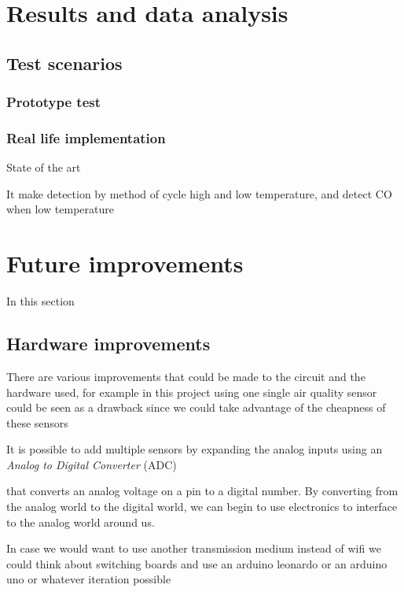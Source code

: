 \documentclass[conference]{IEEEtran}
\begin{document}
\section{Results and data analysis}\label{AA}
	\subsection{Test scenarios}

		\subsubsection{Prototype test}

		\subsubsection{Real life implementation}
			State of the art
	
	It make detection by method of cycle high and low temperature, and detect CO when low temperature \cite{mq7}


\section{Future improvements}\label{improvements}

	In this section 
	
	\subsection{Hardware improvements}
	
		There are various improvements that could be made to the circuit and the hardware used, for example in this project using one single air quality sensor could be seen as a drawback since we could take advantage of the cheapness of these sensors
		
		It is possible to add multiple sensors by expanding the analog inputs using an \textit{Analog to Digital Converter} (ADC)
		
		that converts an analog voltage on a pin to a digital number. By converting from the analog world to the digital world, we can begin to use electronics to interface to the analog world around us.\cite{adc}
	
		In case we would want to use another transmission medium instead of wifi we could think about switching boards and use an arduino leonardo or an arduino uno or whatever iteration possible
		
\end{document}
